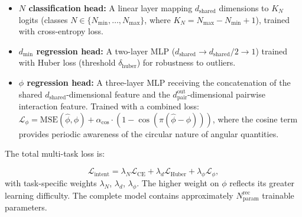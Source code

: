 \documentclass[a4paper,fleqn]{cas-dc}
\begin{document}
\begin{itemize}
    \item \textbf{$N$ classification head:} A linear layer mapping $d_{\text{shared}}$ dimensions to $K_N$ logits (classes $N \in \{N_{\min}, \dots, N_{\max}\}$, where $K_N = N_{\max} - N_{\min} + 1$), trained with cross-entropy loss.
    \item \textbf{$d_{\min}$ regression head:} A two-layer MLP ($d_{\text{shared}} \to d_{\text{shared}}/2 \to 1$) trained with Huber loss (threshold $\delta_{\text{huber}}$) for robustness to outliers.
    \item \textbf{$\phi$ regression head:} A three-layer MLP receiving the concatenation of the shared $d_{\text{shared}}$-dimensional feature and the $d_{\text{pair}}^{\text{out}}$-dimensional pairwise interaction feature. Trained with a combined loss: $\mathcal{L}_{\phi} = \text{MSE}(\hat{\phi}, \phi) + \alpha_{\text{cos}} \cdot (1 - \cos(\pi(\hat{\phi} - \phi)))$, where the cosine term provides periodic awareness of the circular nature of angular quantities.
\end{itemize}

The total multi-task loss is:

\begin{equation}
    \mathcal{L}_{\text{intent}} = \lambda_N \mathcal{L}_{\text{CE}} + \lambda_d \mathcal{L}_{\text{Huber}} + \lambda_{\phi} \mathcal{L}_{\phi},
\end{equation}
with task-specific weights $\lambda_N$, $\lambda_d$, $\lambda_{\phi}$. The higher weight on $\phi$ reflects its greater learning difficulty. The complete model contains approximately $N_{\text{param}}^{\text{rec}}$ trainable parameters.

\end{document}
